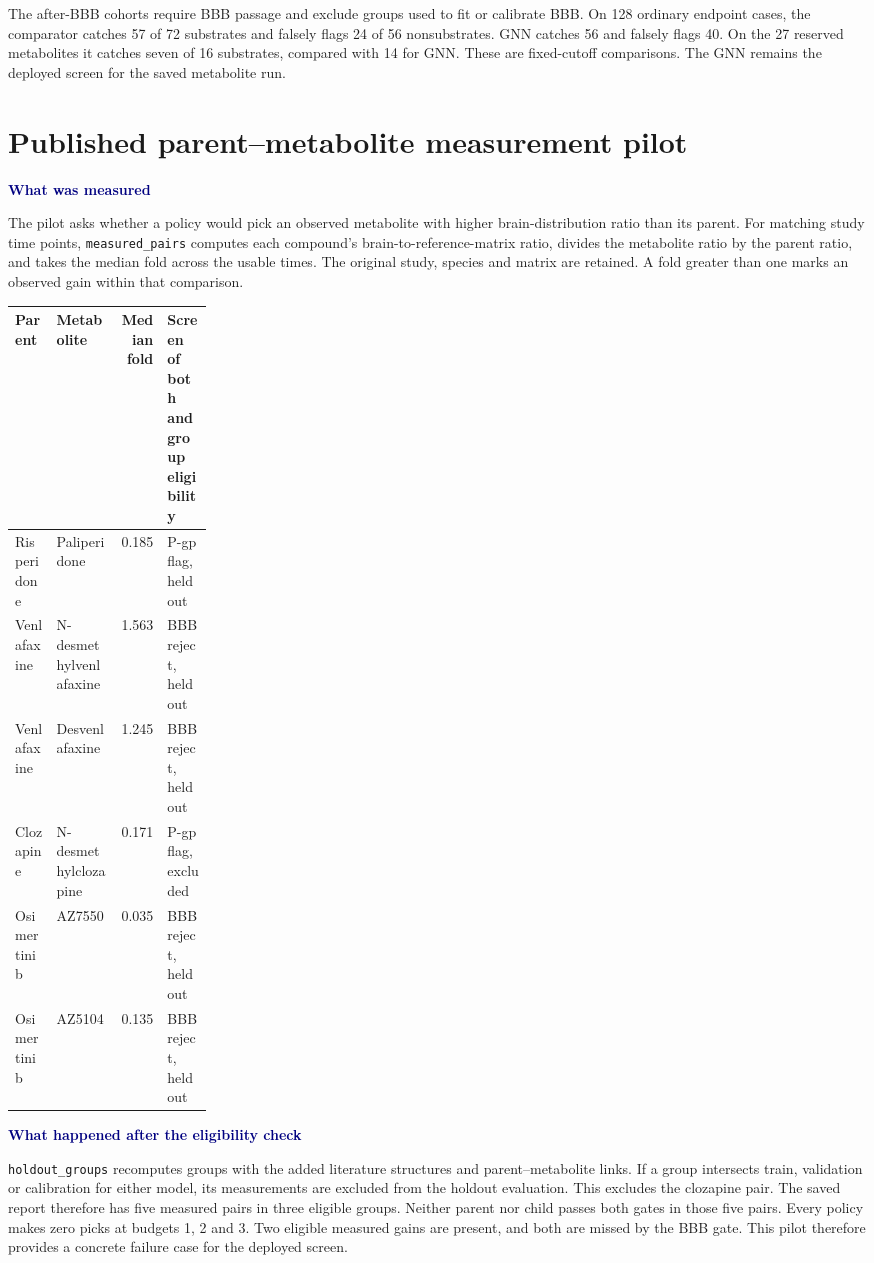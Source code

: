 \documentclass[11pt,a4paper]{article}
\newcommand{\code}[1]{\nolinkurl{#1}}
\newcommand{\lead}[1]{\par\smallskip\textbf{\textcolor{Navy}{#1}}\par\nobreak}
\newcommand{\pagehead}[1]{\clearpage\section{#1}}
\newcommand{\dense}{\small\renewcommand{\arraystretch}{1.11}\setlength{\tabcolsep}{4pt}}
\begin{document}
The after-BBB cohorts require BBB passage and exclude groups used to fit or calibrate BBB. On 128 ordinary endpoint cases, the comparator catches 57 of 72 substrates and falsely flags 24 of 56 nonsubstrates. GNN catches 56 and falsely flags 40. On the 27 reserved metabolites it catches seven of 16 substrates, compared with 14 for GNN. These are fixed-cutoff comparisons. The GNN remains the deployed screen for the saved metabolite run.

\pagehead{Published parent--metabolite measurement pilot}\label{sec:pilot}
\lead{What was measured}
The pilot asks whether a policy would pick an observed metabolite with higher brain-distribution ratio than its parent. For matching study time points, \code{measured_pairs} computes each compound's brain-to-reference-matrix ratio, divides the metabolite ratio by the parent ratio, and takes the median fold across the usable times. The original study, species and matrix are retained. A fold greater than one marks an observed gain within that comparison.

{\dense
\begin{tabularx}{\linewidth}{YYrL{0.23\linewidth}}
\toprule
Parent & Metabolite & Median fold & Screen of both and group eligibility\\
\midrule
Risperidone & Paliperidone & 0.185 & P-gp flag, held out\\
Venlafaxine & N-desmethylvenlafaxine & 1.563 & BBB reject, held out\\
Venlafaxine & Desvenlafaxine & 1.245 & BBB reject, held out\\
Clozapine & N-desmethylclozapine & 0.171 & P-gp flag, excluded\\
Osimertinib & AZ7550 & 0.035 & BBB reject, held out\\
Osimertinib & AZ5104 & 0.135 & BBB reject, held out\\
\bottomrule
\end{tabularx}}

\lead{What happened after the eligibility check}
\code{holdout_groups} recomputes groups with the added literature structures and parent--metabolite links. If a group intersects train, validation or calibration for either model, its measurements are excluded from the holdout evaluation. This excludes the clozapine pair. The saved report therefore has five measured pairs in three eligible groups. Neither parent nor child passes both gates in those five pairs. Every policy makes zero picks at budgets 1, 2 and 3. Two eligible measured gains are present, and both are missed by the BBB gate. This pilot therefore provides a concrete failure case for the deployed screen.
\end{document}
